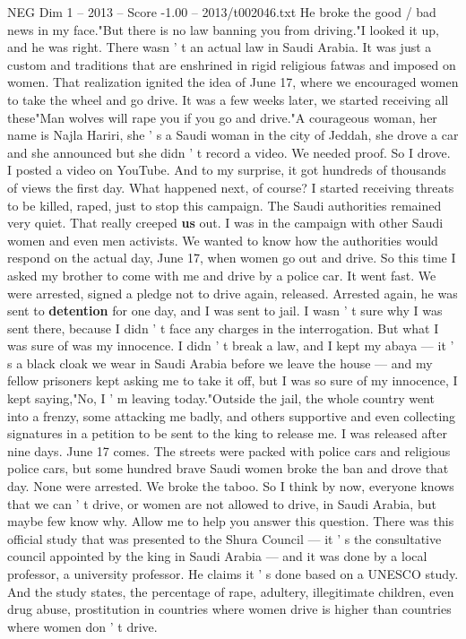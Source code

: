 \begin{textsample}{NEG Dim 1 – 2013 – Score -1.00 – 2013/t002046.txt}
He broke the good / bad news in my face."But there is no law banning you from driving."I looked it up, and he was right.
There wasn ' t an actual law in Saudi Arabia.
It was just a custom and traditions that are enshrined in rigid religious fatwas and imposed on women.
That realization ignited the idea of June 17, where we encouraged women to take the wheel and go drive.
It was a few weeks later, we started receiving all these"Man wolves will rape you if you go and drive."A courageous woman, her name is Najla Hariri, she ' s a Saudi woman in the city of Jeddah, she drove a car and she announced but she didn ' t record a video.
We needed proof.
So I drove.
I posted a video on YouTube.
And to my surprise, it got hundreds of thousands of views the first day.
What happened next, of course?
I started receiving threats to be killed, raped, just to stop this campaign.
The Saudi authorities remained very quiet.
That really creeped \textbf{us} out.
I was in the campaign with other Saudi women and even men activists.
We wanted to know how the authorities would respond on the actual day, June 17, when women go out and drive.
So this time I asked my brother to come with me and drive by a police car.
It went fast.
We were arrested, signed a pledge not to drive again, released.
Arrested again, he was sent to \textbf{detention} for one day, and I was sent to jail.
I wasn ' t sure why I was sent there, because I didn ' t face any charges in the interrogation.
But what I was sure of was my innocence.
I didn ' t break a law, and I kept my abaya — it ' s a black cloak we wear in Saudi Arabia before we leave the house — and my fellow prisoners kept asking me to take it off, but I was so sure of my innocence, I kept saying,"No, I ' m leaving today."Outside the jail, the whole country went into a frenzy, some attacking me badly, and others supportive and even collecting signatures in a petition to be sent to the king to release me.
I was released after nine days.
June 17 comes.
The streets were packed with police cars and religious police cars, but some hundred brave Saudi women broke the ban and drove that day.
None were arrested.
We broke the taboo.
So I think by now, everyone knows that we can ' t drive, or women are not allowed to drive, in Saudi Arabia, but maybe few know why.
Allow me to help you answer this question.
There was this official study that was presented to the Shura Council — it ' s the consultative council appointed by the king in Saudi Arabia — and it was done by a local professor, a university professor.
He claims it ' s done based on a UNESCO study.
And the study states, the percentage of rape, adultery, illegitimate children, even drug abuse, prostitution in countries where women drive is higher than countries where women don ' t drive.

\end{textsample}
